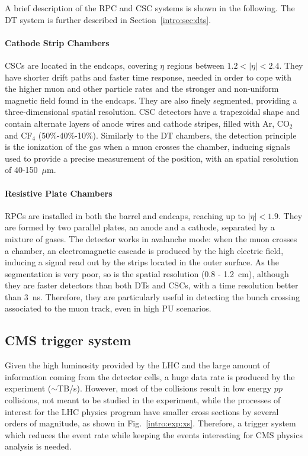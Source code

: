 \documentclass[../main.tex]{subfiles}
\begin{document}
A brief description of the RPC and CSC systems is shown in the following. The DT system is further described in Section~\ref{intro:sec:dts}.


\paragraph{Cathode Strip Chambers}
CSCs are located in the endcaps, covering $\eta$ regions between $1.2<|\eta|<2.4$. They have shorter drift paths and faster time response, needed in order to cope with the higher muon and other particle rates and the stronger and non-uniform magnetic field found in the endcaps. They are also finely segmented, providing a three-dimensional spatial resolution. CSC detectors have a trapezoidal shape and contain alternate layers of anode wires and cathode stripes, filled with Ar, CO${}_2$ and CF${}_4$ (50\%-40\%-10\%). Similarly to the DT chambers, the detection principle is the ionization of the gas when a muon crosses the chamber, inducing signals used to provide a precise measurement of the position, with an spatial resolution of 40-150~$\mu$m.

\paragraph{Resistive Plate Chambers}
RPCs are installed in both the barrel and endcaps, reaching up to $|\eta|<1.9$. They are formed by two parallel plates, an anode and a cathode, separated by a mixture of gases. The detector works in avalanche mode: when the muon crosses a chamber, an electromagnetic cascade is produced by the high electric field, inducing a signal read out by the strips located in the outer surface. As the segmentation is very poor, so is the spatial resolution (0.8 - 1.2~cm), although they are faster detectors than both DTs and CSCs, with a time resolution better than 3~ns. Therefore, they are particularly useful in detecting the bunch crossing associated to the muon track, even in high PU scenarios.




\subsection{CMS trigger system}

Given the high luminosity provided by the LHC and the large amount of information coming from the detector cells, a huge data rate is produced by the experiment ($\sim$TB/s). However, most of the collisions result in low energy $pp$ collisions, not meant to be studied in the experiment, while the processes of interest for the LHC physics program have smaller cross sections by several orders of magnitude, as shown in Fig.~\ref{intro:exp:xs}. Therefore, a trigger system which reduces the event rate while keeping the events interesting for CMS physics analysis is needed. 
\end{document}

